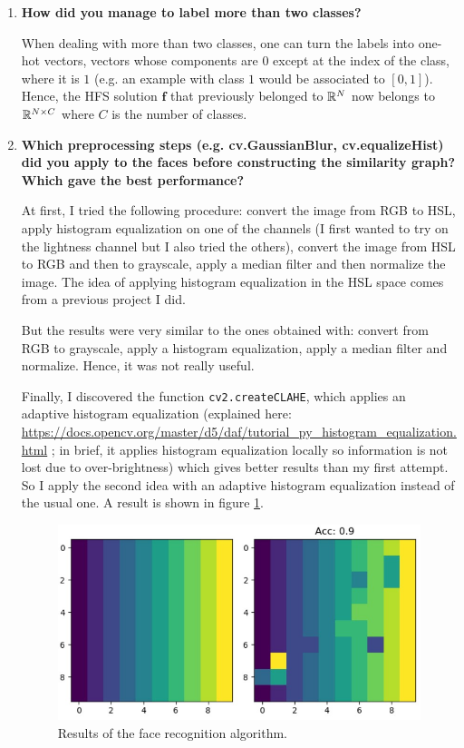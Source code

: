 \documentclass[a4paper, 11pt]{article}
\begin{document}
\begin{enumerate}
	\item \textbf{How did you manage to label more than two classes?}
	
	When dealing with more than two classes, one can turn the labels into one-hot vectors, \ie vectors whose components are $0$ except at the index of the class, where it is $1$ (e.g. an example with class $1$ would be associated to $[0, 1]$). Hence, the HFS solution $\mathbf{f}$ that previously belonged to $\mathbb{R}^{N}$ now belongs to $\mathbb{R}^{N \times C}$ where $C$ is the number of classes.
	
	\item \textbf{Which preprocessing steps (e.g. cv.GaussianBlur, cv.equalizeHist) did you apply to the faces before constructing the similarity graph? Which gave the best performance?}
	
	At first, I tried the following procedure: convert the image from RGB to HSL, apply histogram equalization on one of the channels (I first wanted to try on the lightness channel but I also tried the others), convert the image from HSL to RGB and then to grayscale, apply a median filter and then normalize the image. The idea of applying histogram equalization in the HSL space comes from a previous project I did.
	
	But the results were very similar to the ones obtained with: convert from RGB to grayscale, apply a histogram equalization, apply a median filter and normalize. Hence, it was not really useful. 
	
	Finally, I discovered the function \texttt{cv2.createCLAHE}, which applies an adaptive histogram equalization (explained here: \url{https://docs.opencv.org/master/d5/daf/tutorial_py_histogram_equalization.html} ; in brief, it applies histogram equalization locally so information is not lost due to over-brightness) which gives better results than my first attempt. So I apply the second idea with an adaptive histogram equalization instead of the usual one.
	A result is shown in figure \ref{fig:q22-results}.
	
	\begin{figure}
	    \centering
	    \includegraphics[width=.6\textwidth]{images/q22_results}
	    \caption{Results of the face recognition algorithm.}
	    \label{fig:q22-results}
	\end{figure}
	

\end{enumerate}
\end{document}
